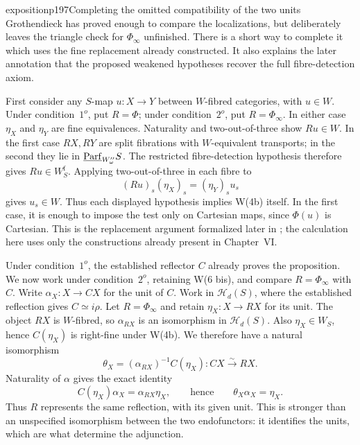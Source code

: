 \begin{dcomment}{exposition}{p197}{Completing the omitted compatibility of the two units}
Grothendieck has proved enough to compare the localizations, but deliberately leaves the triangle check for $\Phi_\infty$ unfinished. There is a short way to complete it which uses the fine replacement already constructed. It also explains the later annotation that the proposed weakened hypotheses recover the full fibre-detection axiom.

First consider any $S$-map $u:X\to Y$ between $W$-fibred categories, with $u\in W$. Under condition~$1^o$, put $R=\Phi$; under condition~$2^o$, put $R=\Phi_\infty$. In either case $\eta_X$ and $\eta_Y$ are fine equivalences. Naturality and two-out-of-three show $Ru\in W$. In the first case $RX,RY$ are split fibrations with $W$-equivalent transports; in the second they lie in $\underline{\mathrm{Parf}}_{W''_\omega}S$. The restricted fibre-detection hypothesis therefore gives $Ru\in W_S^{\mathrm f}$. Applying two-out-of-three in each fibre to
\[
 (Ru)_s(\eta_X)_s=(\eta_Y)_s u_s
\]
gives $u_s\in W$. Thus each displayed hypothesis implies W(4b) itself. In the first case, it is enough to impose the test only on Cartesian maps, since $\Phi(u)$ is Cartesian. This is the replacement argument formalized later in \citet[Lemma~4.4.9 and Corollary~4.4.10]{Grothendieck1991XVI}; the calculation here uses only the constructions already present in Chapter~VI.

Under condition~$1^o$, the established reflector $C$ already proves the proposition. We now work under condition~$2^o$, retaining W(6 bis), and compare $R=\Phi_\infty$ with $C$. Write $\alpha_X:X\to CX$ for the unit of $C$. Work in $\mathcal H_d(S)$, where the established reflection gives $C\simeq i\rho$. Let $R=\Phi_\infty$ and retain $\eta_X:X\to RX$ for its unit. The object $RX$ is $W$-fibred, so $\alpha_{RX}$ is an isomorphism in $\mathcal H_d(S)$. Also $\eta_X\in W_S$, hence $C(\eta_X)$ is right-fine under W(4b). We therefore have a natural isomorphism
\[
 \theta_X=(\alpha_{RX})^{-1}C(\eta_X):CX\xrightarrow{\sim}RX.
\]
Naturality of $\alpha$ gives the exact identity
\[
 C(\eta_X)\alpha_X=\alpha_{RX}\eta_X,
 \qquad\text{hence}\qquad \theta_X\alpha_X=\eta_X.
\]
Thus $R$ represents the same reflection, with its given unit. This is stronger than an unspecified isomorphism between the two endofunctors: it identifies the units, which are what determine the adjunction.


\end{dcomment}
